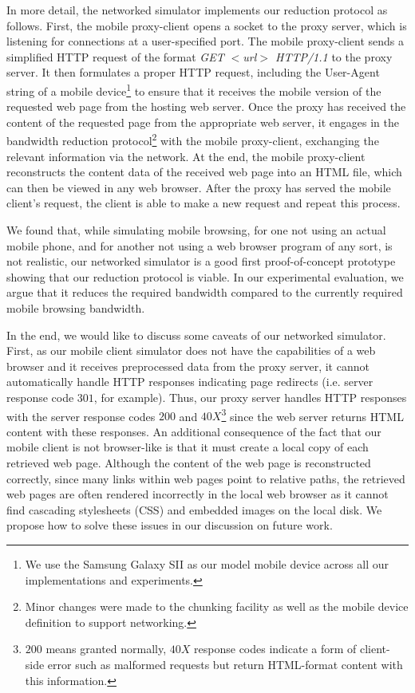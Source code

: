 In more detail, the networked simulator implements our reduction protocol as follows. First, the mobile proxy-client opens a socket to the proxy server, which is listening for connections at a user-specified port. The mobile proxy-client sends a simplified HTTP request of the format \emph{GET $<$url$>$ HTTP/1.1} to the proxy server. It then formulates a proper HTTP request, including the User-Agent string of a mobile device\footnote{We use the Samsung Galaxy SII as our model mobile device across all our implementations and experiments.} to ensure that it receives the mobile version of the requested web page from the hosting web server. Once the proxy has received the content of the requested page from the appropriate web server, it engages in the bandwidth reduction protocol\footnote{Minor changes were made to the chunking facility as well as the mobile device definition to support networking.} with the mobile proxy-client, exchanging the relevant information via the network. At the end, the mobile proxy-client reconstructs the content data of the received web page into an HTML file, which can then be viewed in any web browser. After the proxy has served the mobile client's request, the client is able to make a new request and repeat this process.

We found that, while simulating mobile browsing, for one not using an actual mobile phone, and for another not using a web browser program of any sort, is not realistic, our networked simulator is a good first proof-of-concept prototype showing that our reduction protocol is viable. In our experimental evaluation, we argue that it reduces the required bandwidth compared to the currently required mobile browsing bandwidth.

In the end, we would like to discuss some caveats of our networked simulator. First, as our mobile client simulator does not have the capabilities of a web browser and it receives preprocessed data from the proxy server, it cannot automatically handle HTTP responses indicating page redirects (i.e. server response code $301$, for example). Thus, our proxy server handles HTTP responses with the server response codes $200$ and $40X$\footnote{$200$ means granted normally, $40X$ response codes indicate a form of client-side error such as malformed requests but return HTML-format content with this information.} since the web server returns HTML content with these responses. An additional consequence of the fact that our mobile client is not browser-like is that it must create a local copy of each retrieved web page. Although the content of the web page is reconstructed correctly, since many links within web pages point to relative paths, the retrieved web pages are often rendered incorrectly in the local web browser as it cannot find cascading stylesheets (CSS) and embedded images on the local disk. We propose how to solve these issues in our discussion on future work.
